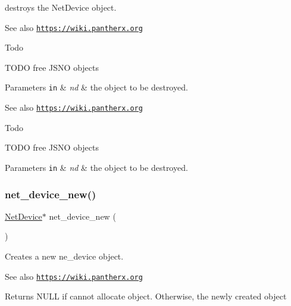 destroys the Net\+Device object. 

\begin{DoxySeeAlso}{See also}
\href{https://wiki.pantherx.org}{\tt https\+://wiki.\+pantherx.\+org}
\end{DoxySeeAlso}
\begin{DoxyRefDesc}{Todo}
\item[\hyperlink{todo__todo000021}{Todo}]T\+O\+DO free J\+S\+NO objects\end{DoxyRefDesc}



\begin{DoxyParams}[1]{Parameters}
\mbox{\tt in}  & {\em nd} & the object to be destroyed.\\
\hline
\end{DoxyParams}
\begin{DoxySeeAlso}{See also}
\href{https://wiki.pantherx.org}{\tt https\+://wiki.\+pantherx.\+org}
\end{DoxySeeAlso}
\begin{DoxyRefDesc}{Todo}
\item[\hyperlink{todo__todo000003}{Todo}]T\+O\+DO free J\+S\+NO objects\end{DoxyRefDesc}



\begin{DoxyParams}[1]{Parameters}
\mbox{\tt in}  & {\em nd} & the object to be destroyed. \\
\hline
\end{DoxyParams}
\mbox{\label{gnode-object_8h_ae666b3f20895e60917e691c81d464235}} 
\subsubsection{\texorpdfstring{net\+\_\+device\+\_\+new()}{net\_device\_new()}}
{\footnotesize\ttfamily \hyperlink{gnode-object_8h_ab9c23d3a2ba4d9157b5ab053f61388dc}{Net\+Device}$\ast$ net\+\_\+device\+\_\+new (\begin{DoxyParamCaption}{ }\end{DoxyParamCaption})}



Creates a new ne\+\_\+device object. 

\begin{DoxySeeAlso}{See also}
\href{https://wiki.pantherx.org}{\tt https\+://wiki.\+pantherx.\+org}
\end{DoxySeeAlso}
\begin{DoxyReturn}{Returns}
N\+U\+LL if cannot allocate object. Otherwise, the newly created object 
\end{DoxyReturn}
\mbox{\label{gnode-object_8h_a0d906716c0b2c59e34bff01153dc23d2}} 
